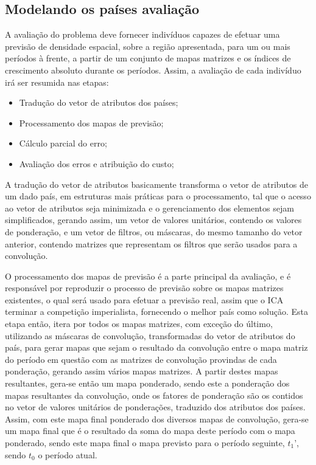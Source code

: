 \subsection{Modelando os países avaliação}
\label{Avaliação dos países}

A avaliação do problema deve fornecer indivíduos capazes de efetuar uma previsão de densidade espacial, sobre a região apresentada, para um ou mais períodos à frente, a partir de um conjunto de mapas matrizes e os índices de crescimento absoluto durante os períodos. Assim, a avaliação de cada indivíduo irá ser resumida nas etapas:

\begin{itemize}
\item Tradução do vetor de atributos dos países;
\item Processamento dos mapas de previsão; 
\item Cálculo parcial do erro;
\item Avaliação dos erros e atribuição do custo;
\end{itemize}

A tradução do vetor de atributos basicamente transforma o vetor de atributos de um dado país, em estruturas mais práticas para o processamento, tal que o acesso ao vetor de atributos seja minimizada e o gerenciamento dos elementos sejam simplificados, gerando assim, um vetor de valores unitários, contendo os valores de ponderação, e um vetor de filtros, ou máscaras, do mesmo tamanho do vetor anterior, contendo matrizes que representam os filtros que serão usados para a convolução.   

O processamento dos mapas de previsão é a parte principal da avaliação, e é responsável por reproduzir o processo de previsão sobre os mapas matrizes existentes, o qual será usado para efetuar a previsão real, assim que o ICA terminar a competição imperialista, fornecendo o melhor país como solução. Esta etapa então, itera por todos os mapas matrizes, com exceção do último, utilizando as máscaras de convolução, transformadas do vetor de atributos do país, para gerar mapas que sejam o resultado da convolução entre o mapa matriz do período em questão com as matrizes de convolução provindas de cada ponderação, gerando assim vários mapas matrizes. A partir destes mapas resultantes, gera-se então um mapa ponderado, sendo este a ponderação dos mapas resultantes da convolução, onde os fatores de ponderação são os contidos no vetor de valores unitários de ponderações, traduzido dos atributos dos países. Assim, com este mapa final ponderado dos diversos mapas de convolução, gera-se um mapa final que é o resultado da soma do mapa deste período com o mapa ponderado, sendo este mapa final o mapa previsto para o período seguinte, \(t_1’\), sendo \(t_0\) o período atual. 

